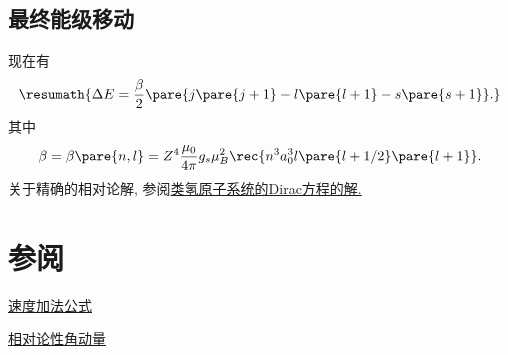 \documentclass[hidelinks]{ctexart}
\begin{document}

\subsection{最终能级移动} %
\label{sub:最终能级移动}

现在有
\[ \resumath{\Delta E = \frac{\beta}{2}\pare{j\pare{j+1} - l\pare{l+1} - s\pare{s+1}}.} \]
其中
\[ \beta = \beta\pare{n,l} = Z^4 \frac{\mu_0}{4\pi}g_s \mu_B^2 \rec{n^3 a_0^3 l\pare{l+1/2}\pare{l+1}}. \]
关于精确的相对论解, 参阅\href{https://en.wikipedia.org/wiki/Hydrogen-like_atom#Solution_to_Dirac_equation}{类氢原子系统的Dirac方程的解.}



\section{参阅} %
\label{sec:参阅}

\begin{citem}
    \item \href{https://en.wikipedia.org/wiki/Velocity-addition_formula}{速度加法公式}
    \item \href{https://en.wikipedia.org/wiki/Relativistic_angular_momentum}{相对论性角动量}
\end{citem}

\end{document}
